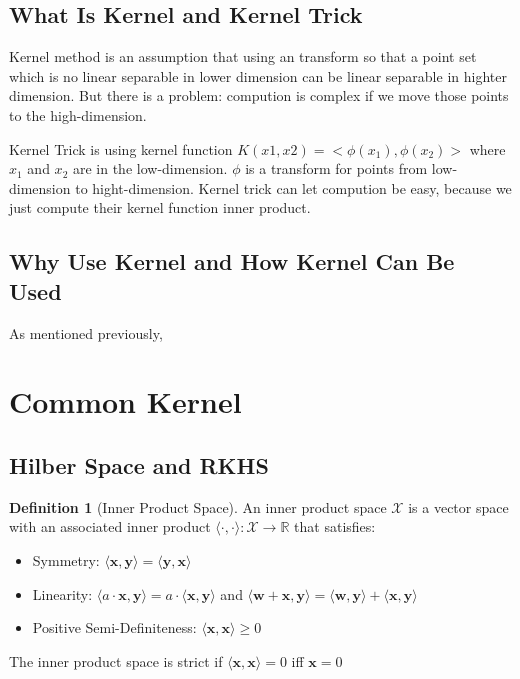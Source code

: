 \documentclass[12pt]{article}
\theoremstyle{definition}
\newtheorem{definition}{Definition}[section]
\theoremstyle{remark}
\begin{document}
\subsection{What Is Kernel and Kernel Trick}
Kernel method is an assumption that using an transform so that a point set which is no linear separable in lower dimension can be linear separable in highter dimension. But there is a problem: compution is complex if we move those points to the high-dimension.\par
Kernel Trick is using kernel function $ K(x1,x2) = <\phi(x_{1}), \phi(x_{2})> $ where $x_{1}$ and $x_{2}$ are in the low-dimension. $ \phi$ is a transform for points from low-dimension to hight-dimension. Kernel trick can let compution be easy, because we just compute their kernel function inner product.
\subsection{Why Use Kernel and How Kernel Can Be Used}
As mentioned previously,

\section{Common Kernel}
\subsection{Hilber Space and RKHS}
\begin{definition}[Inner Product Space]
  An inner product space \(\mathcal{X}\) is a vector space with an associated inner product \(\langle \cdot,\cdot \rangle: \mathcal{X} \rightarrow \mathbb{R}\) that satisfies:
  \begin{itemize}
    \item Symmetry: \(\langle \mathbf{x}, \mathbf{y} \rangle = \langle \mathbf{y}, \mathbf{x} \rangle\)
    \item Linearity: \(\langle a \cdot \mathbf{x}, \mathbf{y} \rangle = a \cdot \langle \mathbf{x}, \mathbf{y} \rangle\) and \(\langle \mathbf{w} + \mathbf{x}, \mathbf{y} \rangle =  \langle \mathbf{w}, \mathbf{y} \rangle + \langle \mathbf{x}, \mathbf{y} \rangle\)
    \item Positive Semi-Definiteness: \( \langle \mathbf{x}, \mathbf{x} \rangle \geq 0 \)
  \end{itemize}
  The inner product space is strict if \( \langle \mathbf{x}, \mathbf{x} \rangle = 0 \) iff \( \mathbf{x} = 0 \)
\end{definition}
\end{document}
